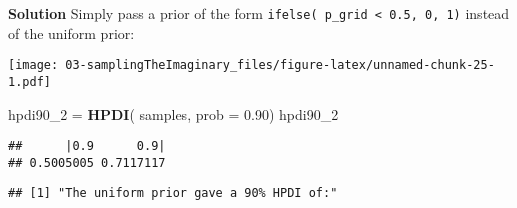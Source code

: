 \documentclass[
]{book}
\newenvironment{Shaded}{\begin{snugshade}}{\end{snugshade}}
\newcommand{\DataTypeTok}[1]{\textcolor[rgb]{0.13,0.29,0.53}{#1}}
\newcommand{\DecValTok}[1]{\textcolor[rgb]{0.00,0.00,0.81}{#1}}
\newcommand{\FloatTok}[1]{\textcolor[rgb]{0.00,0.00,0.81}{#1}}
\newcommand{\KeywordTok}[1]{\textcolor[rgb]{0.13,0.29,0.53}{\textbf{#1}}}
\newcommand{\NormalTok}[1]{#1}
\newcommand{\OperatorTok}[1]{\textcolor[rgb]{0.81,0.36,0.00}{\textbf{#1}}}
\newcommand{\OtherTok}[1]{\textcolor[rgb]{0.56,0.35,0.01}{#1}}
\newcommand{\StringTok}[1]{\textcolor[rgb]{0.31,0.60,0.02}{#1}}
\begin{document}
\textbf{Solution}
Simply pass a prior of the form \texttt{ifelse(\ p\_grid\ \textless{}\ 0.5,\ 0,\ 1)} instead of the uniform prior:

\begin{Shaded}
\end{Shaded}

\texttt{[image: 03-samplingTheImaginary\_files/figure-latex/unnamed-chunk-25-1.pdf]}

\begin{Shaded}
\begin{Highlighting}[]
\NormalTok{hpdi90_}\DecValTok{2}\NormalTok{ =}\StringTok{ }\KeywordTok{HPDI}\NormalTok{( samples, }\DataTypeTok{prob =} \FloatTok{0.90}\NormalTok{)}
\NormalTok{hpdi90_}\DecValTok{2}
\end{Highlighting}
\end{Shaded}

\begin{verbatim}
##      |0.9      0.9| 
## 0.5005005 0.7117117
\end{verbatim}

\begin{Shaded}
\end{Shaded}

\begin{verbatim}
## [1] "The uniform prior gave a 90% HPDI of:"
\end{verbatim}
\end{document}

